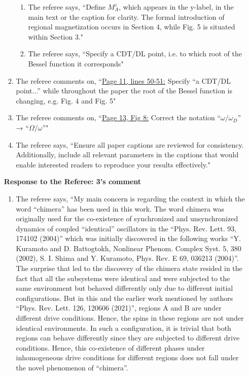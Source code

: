 \documentclass[aps,prb,reprint,showpacs,floatfix,superscriptaddress, onecolumn, nofootinbib, 10pt]{revtex4-2}
\newcommand{\comment}[1]{{\color{blue}#1}} %
\begin{document}
\begin{enumerate}
\begin{enumerate}
\begin{enumerate}
			\item The referee says, \comment{``Define $M_A^z$, which appears in the y-label, in the main text or the caption for
				clarity. The formal introduction of regional magnetization occurs in Section 4, while
				Fig. 5 is situated within Section 3."}\\
			\item The referee says, \comment{``Specify a CDT/DL point, i.e. to which root of the Bessel function it corresponds"}
		\end{enumerate}
		\item The referee comments on, \comment{``\underline{Page 11, lines 50-51:} Specify “a CDT/DL point...” while throughout the paper the root of the Bessel function is changing, e.g. Fig. 4 and Fig. 5"}
		\item The referee comments on, \comment{``\underline{Page 13, Fig 8:} Correct the notation “$\omega/\omega_D$” → “$\Omega/\omega$”"}
		\item The referee says, \comment{``Ensure all paper captions are reviewed for consistency. Additionally, include all relevant
			parameters in the captions that would enable interested readers to reproduce your
			results effectively."}
	\end{enumerate}

	\newpage
	\noindent \textbf{Response to the Referee: 3's comment}
	\begin{enumerate}
		\item The referee says, \comment{``My main concern is regarding the context in which the word “chimera” has been used
			in this work. The word chimera was originally used for the co-existence of synchronized and unsynchronized dynamics of coupled “identical” oscillators in the “Phys. Rev. Lett. 93, 174102 (2004)” which was initially discovered in the following
			works “Y. Kuramoto and D. Battogtokh, Nonlinear Phenom. Complex Syst. 5, 380 (2002), S. I. Shima and Y. Kuramoto, Phys. Rev. E 69, 036213 (2004)”. The surprise that led to the discovery of the chimera state resided in the fact that all the
			subsystems were identical and were subjected to the same environment but behaved differently only due to different initial configurations. But in this and the earlier work mentioned by authors “Phys. Rev. Lett. 126, 120606 (2021)”, regions A and B are under different drive conditions. Hence, the spins in these regions are not under identical environments. In such a configuration, it is trivial that both regions can behave differently since they are subjected to different drive conditions. Hence, this co-existence of different phases under inhomogeneous drive conditions for different
			regions does not fall under the novel phenomenon of “chimera”.\\
			
}
\end{enumerate}
\end{enumerate}
\end{document}
